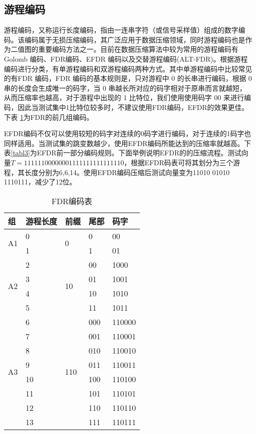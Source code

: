 \subsection{游程编码}

游程编码，又称运行长度编码，指由一连串字符（或信号采样值）组成的数字编码。该编码属于无损压缩编码，其广泛应用于数据压缩领域，同时游程编码\cite{54}也是作为二值图的重要编码方法之一。目前在数据压缩算法中较为常用的游程编码有Golomb 编码\cite{55}、FDR编码\cite{56}、EFDR 编码\cite{57}以及交替游程编码(ALT-FDR)\cite{58}。根据游程编码进行分类，有单游程编码和双游程编码两种方式。其中单游程编码中比较常见的有FDR 编码，FDR 编码的基本规则是，只对游程中 0 的长串进行编码，根据 0 串的长度会生成唯一的码字，当 0 串越长所对应的码字相对于原串而言就越短，从而压缩率也越高，对于游程中出现的 1 比特位，我们使用使用码字 00 来进行编码，因此当测试集中1比特位较多时，不建议使用FDR编码，EFDR的效果更佳。下表
\ref{tabl2}为FDR的前几组编码。

EFDR编码不仅可以使用较短的码字对连续的0码字进行编码，对于连续的1码字也同样适用。当测试集的跳变数越少，使用EFDR编码所能达到的压缩率就越高。下表\ref{tabl3}为EFDR前一部分编码规则。下面举例说明EFDR的的压缩流程。测试向量$T={1111110 0000001 111111111111110}$，根据EFDR码表可将其划分为三个游程，其长度分别为{6,6,14}。使用EFDR编码压缩后测试向量变为{11010 01010 1110111}，减少了12位。
\begin{table}[H]
\centering
\caption{FDR编码表}\label{tabl2}
\begin{tabular}{p{1.6cm}p{2.7cm}<{\centering}p{2.7cm}<{\centering}p{3cm}<{\centering}p{3.6cm}<{\centering}}
\toprule
\textbf{组}&	\textbf{游程长度}&     \textbf{前缀}&   \textbf{尾部}&   \textbf{码字}\\
\midrule
\multirow{2}{*}{A1} & 0 & \multirow{2}{*}{0} & 0 & 00 \\
& 1 &  & 1 & 01 \\
\hline
\multirow{4}{*}{A2} & 2 & \multirow{4}{*}{10} & 00 & 1000 \\
& 3 &  & 01 & 1001 \\
& 4 &  & 10 & 1010 \\
& 5 &  & 11 & 1011 \\
\hline
\multirow{8}{*}{A3} & 6 & \multirow{8}{*}{110} & 000 & 110000 \\
& 7 &  & 001 & 110001 \\
& 8 &  & 010 & 110010 \\
& 9 &  & 011 & 110011 \\
& 10 &  & 100 & 110100 \\
& 11 &  & 101 & 110101 \\
& 12 &  & 110 & 110110 \\
& 13 &  & 111 & 110111 \\
\bottomrule
\end{tabular}
\end{table}

